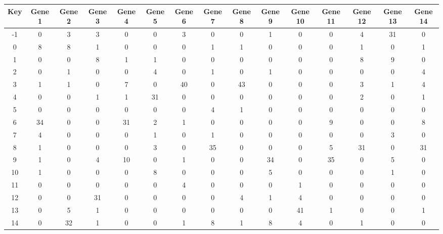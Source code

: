 \begin{tabular}{|c|c|c|c|c|c|c|c|c|c|c|c|c|c|c|}
\hline
Key & Gene 1 & Gene 2 & Gene 3 & Gene 4 & Gene 5 & Gene 6 & Gene 7 & Gene 8 & Gene 9 & Gene 10 & Gene 11 & Gene 12 & Gene 13 & Gene 14 \\
\hline
-1 & 0 & 3 & 3 & 0 & 0 & 3 & 0 & 0 & 1 & 0 & 0 & 4 & 31 & 0 \\
0 & 8 & 8 & 1 & 0 & 0 & 0 & 1 & 1 & 0 & 0 & 0 & 1 & 0 & 1 \\
1 & 0 & 0 & 8 & 1 & 1 & 0 & 0 & 0 & 0 & 0 & 0 & 8 & 9 & 0 \\
2 & 0 & 1 & 0 & 0 & 4 & 0 & 1 & 0 & 1 & 0 & 0 & 0 & 0 & 4 \\
3 & 1 & 1 & 0 & 7 & 0 & 40 & 0 & 43 & 0 & 0 & 0 & 3 & 1 & 4 \\
4 & 0 & 0 & 1 & 1 & 31 & 0 & 0 & 0 & 0 & 0 & 0 & 2 & 0 & 1 \\
5 & 0 & 0 & 0 & 0 & 0 & 0 & 4 & 1 & 0 & 0 & 0 & 0 & 0 & 0 \\
6 & 34 & 0 & 0 & 31 & 2 & 1 & 0 & 0 & 0 & 0 & 9 & 0 & 0 & 8 \\
7 & 4 & 0 & 0 & 0 & 1 & 0 & 1 & 0 & 0 & 0 & 0 & 0 & 3 & 0 \\
8 & 1 & 0 & 0 & 0 & 3 & 0 & 35 & 0 & 0 & 0 & 5 & 31 & 0 & 31 \\
9 & 1 & 0 & 4 & 10 & 0 & 1 & 0 & 0 & 34 & 0 & 35 & 0 & 5 & 0 \\
10 & 1 & 0 & 0 & 0 & 8 & 0 & 0 & 0 & 5 & 0 & 0 & 0 & 1 & 0 \\
11 & 0 & 0 & 0 & 0 & 0 & 4 & 0 & 0 & 0 & 1 & 0 & 0 & 0 & 0 \\
12 & 0 & 0 & 31 & 0 & 0 & 0 & 0 & 4 & 1 & 4 & 0 & 0 & 0 & 0 \\
13 & 0 & 5 & 1 & 0 & 0 & 0 & 0 & 0 & 0 & 41 & 1 & 0 & 0 & 1 \\
14 & 0 & 32 & 1 & 0 & 0 & 1 & 8 & 1 & 8 & 4 & 0 & 1 & 0 & 0 \\
\hline
\end{tabular}